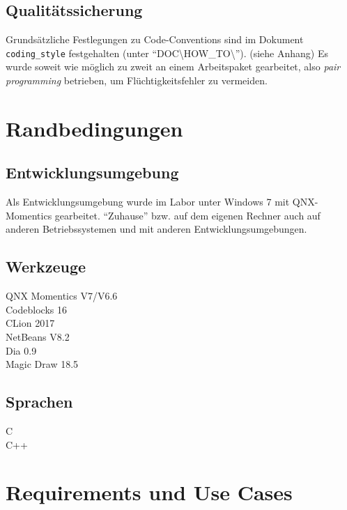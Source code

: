 \documentclass[
   draft=false
  ,paper=a4
  ,twoside=true
  ,fontsize=11pt
  ,headsepline
  ,DIV11
  ,parskip=full+
]{scrartcl} %
\begin{document}
\subsection{Qualitätssicherung} %
Grundsätzliche Festlegungen zu Code-Conventions sind im Dokument \texttt{coding\_style} festgehalten (unter ``DOC\textbackslash HOW\_TO\textbackslash''). (siehe Anhang)
Es wurde soweit wie möglich zu zweit an einem Arbeitspaket gearbeitet, also \emph{pair programming} betrieben, um Flüchtigkeitsfehler zu vermeiden. 

\section{Randbedingungen}
\subsection{Entwicklungsumgebung}
Als Entwicklungsumgebung wurde im Labor unter Windows 7 mit QNX-Momentics gearbeitet. ``Zuhause'' bzw. auf dem eigenen Rechner auch auf anderen Betriebssystemen und mit anderen Entwicklungsumgebungen.

\subsection{Werkzeuge}

\begin{description}
\item[QNX Momentics V7/V6.6] 
\item[Codeblocks 16] 
\item[CLion 2017]
\item[NetBeans V8.2] 
\item[Dia 0.9] 
\item[Magic Draw 18.5] 
\end{description}

\subsection{Sprachen}

\begin{description}
\item[C] %
\item[C++] 

\end{description}

\section{Requirements und Use Cases}
\end{document}
